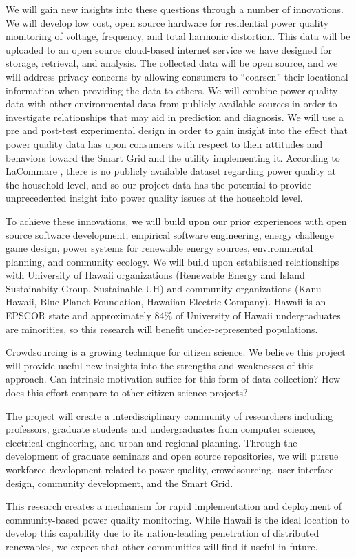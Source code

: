 \documentclass[11pt]{article}
\begin{document}
We will gain new insights into these questions through a number of innovations.  We will develop low cost, open source hardware for residential power quality monitoring of voltage, frequency, and total harmonic distortion. This data will be uploaded to an open source cloud-based internet service we have designed for storage, retrieval, and analysis. The collected data will be open source, and we will address privacy concerns by allowing consumers to ``coarsen'' their locational information when providing the data to others.  We will combine power quality data with other environmental data from publicly available sources in order to investigate relationships that may aid in prediction and diagnosis.  We will use a pre and post-test experimental design in order to gain insight into the effect that power quality data has upon consumers with respect to their attitudes and behaviors toward the Smart Grid and the utility implementing it.  According to LaCommare \cite{LaCommare2004}, there is no publicly available dataset regarding power quality at the household level, and so our project data has the potential to provide unprecedented insight into power quality issues at the household level.

To achieve these innovations, we will build upon our prior experiences with open source software development, empirical software engineering, energy challenge game design, power systems for renewable energy sources, environmental planning, and community ecology. We will build upon established relationships with University of Hawaii organizations (Renewable Energy and Island Sustainabity Group, Sustainable UH) and community organizations (Kanu Hawaii, Blue Planet Foundation, Hawaiian Electric Company).  Hawaii is an EPSCOR state and approximately 84\% of University of Hawaii undergraduates are minorities, so this research will benefit under-represented populations.

Crowdsourcing is a growing technique for citizen science. We believe this project will provide useful new insights into the strengths and weaknesses of this approach. Can intrinsic motivation suffice for this form of data collection? How does this effort compare to other citizen science projects? 

The project will create a interdisciplinary community of researchers including professors, graduate students and undergraduates from computer science, electrical engineering, and urban and regional planning.  Through the development of graduate seminars and open source repositories, we will pursue workforce development related to power quality, crowdsourcing, user interface design, community development, and the Smart Grid.

This research creates a mechanism for rapid implementation and deployment of community-based power quality monitoring. While Hawaii is the ideal location to develop this capability due to its nation-leading penetration of distributed renewables, we expect that other communities will find it useful in future.




\end{document}
